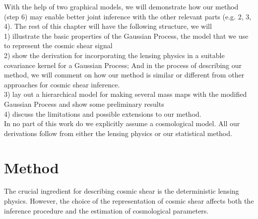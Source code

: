 With the help of two graphical models, we will demonstrate how our method
(step 6) may enable better joint inference with the other relevant parts (e.g. 2, 3, 4). 
The rest of this chapter will have the following structure, we will \\ 
1) illustrate the basic properties of the Gaussian Process, the model that we
use to represent the cosmic shear signal\\ 
2) show the derivation for incorporating the lensing physics in 
a suitable covariance kernel for a Gaussian Process;  
And in the process of describing our method, we will comment on how our method is  
similar or different from other approaches for cosmic shear inference. \\
3) lay out a hierarchical model for making several mass maps 
with the modified Gaussian Process and show some preliminary results \\ 
4) discuss the limitations and possible extensions to our method.\\
In no part of this work do we explicitly assume a cosmological model. All our
derivations follow from either the lensing physics or our statistical method.   


\section{Method}

The crucial ingredient for describing cosmic shear is the deterministic
lensing physics. However, 
the choice of the representation of cosmic shear affects both the
inference procedure and the estimation of cosmological parameters. 

